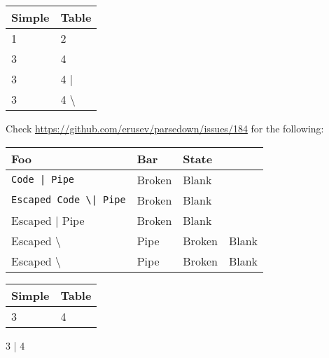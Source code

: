 \noindent\begin{tabular}{|l|l|}\hline
Simple & Table\\ \hline
1      & 2\\ \hline
3      & 4\\ \hline
3      & 4     |\\ \hline
3      & 4    {\textbackslash}\\ \hline
\end{tabular}
Check \url{https://github.com/erusev/parsedown/issues/184} for the following:


\noindent\begin{tabular}{|l|l|l|}\hline
Foo & Bar & State\\ \hline
\lstinline`Code | Pipe` & Broken & Blank\\ \hline
\lstinline`Escaped Code \| Pipe` & Broken & Blank\\ \hline
Escaped | Pipe & Broken & Blank\\ \hline
Escaped {\textbackslash}& Pipe & Broken & Blank\\ \hline
Escaped {\textbackslash} & Pipe & Broken & Blank\\ \hline
\end{tabular}

\noindent\begin{tabular}{|l|l|}\hline
Simple & Table\\ \hline
3      & 4\\ \hline
\end{tabular}
3      | 4

